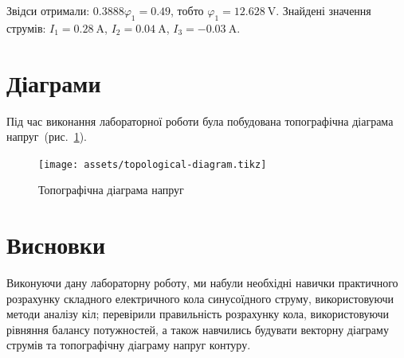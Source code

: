 \documentclass[a4paper,oneside,DIV=12,12pt]{scrartcl}
\begin{document}
			Звідси отримали: $\num{0.3888} \varphi_1 = \num{0.49}$, тобто $\varphi_1 = \SI{12.628}{\volt}$. Знайдені значення струмів: $I_1 = \SI{0.28}{\ampere}$, $I_2 = \SI{0.04}{\ampere}$, $I_3 = \SI{-0.03}{\ampere}$.
			
		\section{Діаграми}
			Під час виконання лабораторної роботи була побудована топографічна діаграма напруг~(рис.~\ref{fig:topological-diagram}).
			
			\begin{figure}[!htbp]
			\centering
				\texttt{[image: assets/topological-diagram.tikz]}
			\caption{Топографічна діаграма напруг}
			\label{fig:topological-diagram}
			\end{figure}
		
	\section{Висновки}
		Виконуючи дану лабораторну роботу, ми набули необхідні навички практичного розрахунку складного електричного кола синусоїдного струму, використовуючи методи аналізу кіл; перевірили правильність розрахунку кола, використовуючи рівняння балансу потужностей, а також навчились будувати векторну діаграму струмів та топографічну діаграму напруг контуру.
		
\end{document}
